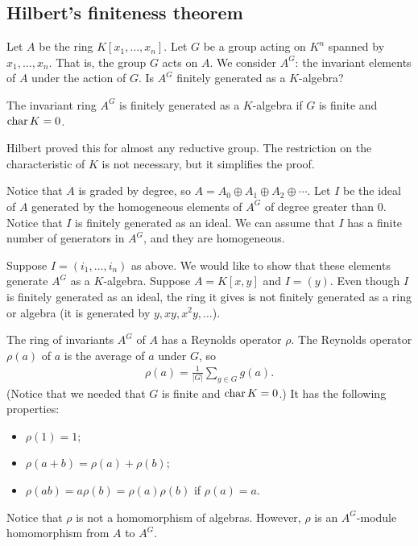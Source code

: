 \documentclass[11pt, oneside,margin=1in]{article}
\begin{document}
\subsection{Hilbert's finiteness theorem}
Let $A$ be the ring $K[x_1,\hdots, x_n]$. Let $G$ be a group acting on $K^n$ spanned by $x_1,\hdots, x_n$. That is, the group $G$ acts on $A$. We consider $A^G$: the invariant elements of $A$ under the action of $G$. Is $A^G$ finitely generated as a $K$-algebra?

\begin{theorem}[Hilbert]\label{}\text{}
The invariant ring $A^G$ is finitely generated as a $K$-algebra if $G$ is finite and $\operatorname{char} K = 0$.
\end{theorem}
\begin{remark}
	Hilbert proved this for almost any reductive group. The restriction on the characteristic of $K$ is not necessary, but it simplifies the proof.
\end{remark}

Notice that $A$ is graded by degree, so $A = A_0\oplus A_1\oplus A_2\oplus \cdots$. Let $I$ be the ideal of $A$ generated by the homogeneous elements of $A^G$ of degree greater than $0$. Notice that $I$ is finitely generated as an ideal. We can assume that $I$ has a finite number of generators in $A^G$, and they are homogeneous. 

Suppose $I=(i_1,\hdots,i_n)$ as above. We would like to show that these elements generate $A^G$ as a $K$-algebra. Suppose $A=K[x,y]$ and $I = (y)$. Even though $I$ is finitely generated as an ideal, the ring it gives is not finitely generated as a ring or algebra (it is generated by $y, xy, x^2y,\hdots$). 

The ring of invariants $A^G$ of $A$ has a Reynolds operator $\rho$. The Reynolds operator $\rho(a)$ of $a$ is the average of $a$ under $G$, so
\begin{align*}
	\rho(a) = \frac{1}{\left\lvert G \right\rvert } \sum_{g\in G}^{} g(a).
\end{align*}
(Notice that we needed that $G$ is finite and $\operatorname{char} K = 0$.) It has the following properties:
\begin{itemize}
	\item $\rho(1)=1$;
	\item $\rho(a+b) = \rho (a)+\rho (b)$;
	\item $\rho(ab) = a\rho (b)=\rho(a)\rho (b)$ if $\rho(a)=a$.
\end{itemize}
Notice that $\rho$ is not a homomorphism of algebras. However, $\rho$ is an $A^G$-module homomorphism from $A$ to $A^G$.
\end{document}
